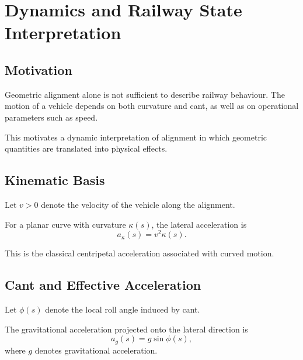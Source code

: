 \chapter{Dynamics and Railway State Interpretation}

\section{Motivation}

\begin{remark}
Geometric alignment alone is not sufficient to describe railway behaviour.
The motion of a vehicle depends on both curvature and cant, as well as
on operational parameters such as speed.
\end{remark}

\begin{remark}
This motivates a dynamic interpretation of alignment in which geometric
quantities are translated into physical effects.
\end{remark}

\section{Kinematic Basis}

\begin{definition}[Velocity]
Let $v>0$ denote the velocity of the vehicle along the alignment.
\end{definition}

\begin{definition}
For a planar curve with curvature $\kappa(s)$, the lateral acceleration is
\[
a_\kappa(s) = v^2 \kappa(s).
\]
\end{definition}

\begin{remark}
This is the classical centripetal acceleration associated with curved motion.
\end{remark}

\section{Cant and Effective Acceleration}

\begin{definition}
Let $\phi(s)$ denote the local roll angle induced by cant.
\end{definition}

\begin{definition}
The gravitational acceleration projected onto the lateral direction is
\[
a_g(s) = g \sin\phi(s),
\]
where $g$ denotes gravitational acceleration.
\end{definition}


